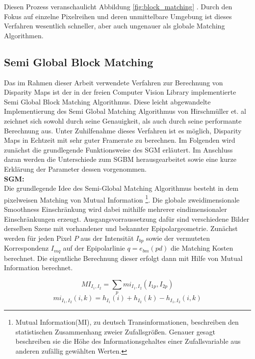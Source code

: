 \noindent
Diesen Prozess veranschaulicht Abbildung \ref{fig:block_matching} . Durch den Fokus auf einzelne Pixelreihen und deren unmittelbare Umgebung ist dieses Verfahren wesentlich schneller, aber auch ungenauer als globale Matching Algorithmen. 
 

\subsection{Semi Global Block Matching}
\label{subsec:stereo_matching_sgbm}
Das im Rahmen dieser Arbeit verwendete Verfahren zur Berechnung von Disparity Maps ist der in der freien Computer Vision Library implementierte Semi Global Block Matching Algorithmus. Diese leicht abgewandelte Implementierung des Semi Global Matching Algorithmus von Hirschmüller et. al \cite{hirschmuller2005sgm} zeichnet sich sowohl durch seine Genauigkeit, als auch durch seine performante Berechnung aus. Unter Zuhilfenahme dieses Verfahren ist es möglich, Disparity Maps in Echtzeit mit sehr guter Framerate zu berechnen. Im Folgenden wird zunächst die grundlegende Funktionsweise des SGM erläutert. Im Anschluss daran werden die Unterschiede zum SGBM herausgearbeitet sowie eine kurze Erklärung der Parameter dessen vorgenommen.\\

\noindent
\textbf{SGM:} \\
Die grundlegende Idee des Semi-Global Matching Algorithmus besteht in dem pixelweisen Matching von Mutual Information \footnote{Mutual Information(MI), zu deutsch Transinformationen, beschreiben den statistischen Zusammenhang zweier Zufallsgrößen. Genauer gesagt beschreiben sie die Höhe des Informationsgehaltes einer Zufallsvariable aus anderen zufällig gewählten Werten.}. Die globale zweidimensionale Smoothness Einschränkung wird dabei mithilfe mehrerer eindimensionaler Einschränkungen erzeugt. Ausgangsvorraussetzung dafür sind verschiedene Bilder derselben Szene mit vorhandener und bekannter Epipolargeometrie. 
Zunächst werden für jeden Pixel $P$ aus der Intensität $I_{bp}$ sowie der vermuteten Korrespondenz $I_{mq}$ auf der Epipolarlinie $q=e_{bm}(pd)$ die Matching Kosten berechnet. Die eigentliche Berechnung dieser erfolgt dann mit Hilfe von Mutual Information berechnet.

\begin{equation}\label{eq:mutual_information_1}
MI_{I_1,I_2} = \sum_{p} mi_{I_1,I_2}(I_{1p},I_{2p})
\end{equation}
\begin{equation}\label{eq:mutual_information_2}
mi_{I_1,I_2} (i,k) = h_{I_1}(i)+h_{I_2}(k)-h_{I_1,I_2}(i,k)
\end{equation}

